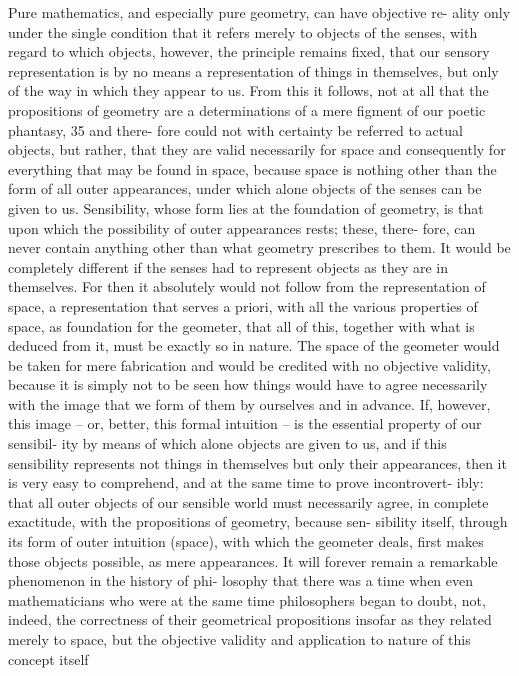 Pure mathematics, and especially pure geometry, can have objective re-
ality only under the single condition that it refers merely to objects of
the senses, with regard to which objects, however, the principle remains
ﬁxed, that our sensory representation is by no means a representation
of things in themselves, but only of the way in which they appear to us.
From this it follows, not at all that the propositions of geometry are a
determinations of a mere ﬁgment of our poetic phantasy, 35 and there-
fore could not with certainty be referred to actual objects, but rather,
that they are valid necessarily for space and consequently for everything
that may be found in space, because space is nothing other than the form
of all outer appearances, under which alone objects of the senses can be
given to us. Sensibility, whose form lies at the foundation of geometry, is
that upon which the possibility of outer appearances rests; these, there-
fore, can never contain anything other than what geometry prescribes
to them. It would be completely different if the senses had to represent
objects as they are in themselves. For then it absolutely would not follow
from the representation of space, a representation that serves a priori,
with all the various properties of space, as foundation for the geometer,
that all of this, together with what is deduced from it, must be exactly so
in nature. The space of the geometer would be taken for mere fabrication
and would be credited with no objective validity, because it is simply not
to be seen how things would have to agree necessarily with the image that
we form of them by ourselves and in advance. If, however, this image –
or, better, this formal intuition – is the essential property of our sensibil-
ity by means of which alone objects are given to us, and if this sensibility
represents not things in themselves but only their appearances, then it
is very easy to comprehend, and at the same time to prove incontrovert-
ibly: that all outer objects of our sensible world must necessarily agree,
in complete exactitude, with the propositions of geometry, because sen-
sibility itself, through its form of outer intuition (space), with which the
geometer deals, ﬁrst makes those objects possible, as mere appearances.
It will forever remain a remarkable phenomenon in the history of phi-
losophy that there was a time when even mathematicians who were at
the same time philosophers began to doubt, not, indeed, the correctness
of their geometrical propositions insofar as they related merely to space,
but the objective validity and application to nature of this concept itself
